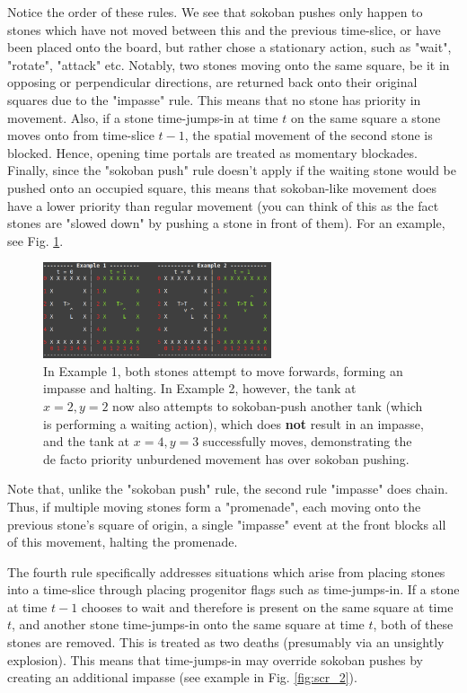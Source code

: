 \documentclass[12pt]{article}
\begin{document}
	Notice the order of these rules. We see that sokoban pushes only happen to stones which have not moved between this and the previous time-slice, or have been placed onto the board, but rather chose a stationary action, such as "wait", "rotate", "attack" etc. Notably, two stones moving onto the same square, be it in opposing or perpendicular directions, are returned back onto their original squares due to the "impasse" rule. This means that no stone has priority in movement. Also, if a stone time-jumps-in at time $t$ on the same square a stone moves onto from time-slice $t-1$, the spatial movement of the second stone is blocked. Hence, opening time portals are treated as momentary blockades. Finally, since the "sokoban push" rule doesn't apply if the waiting stone would be pushed onto an occupied square, this means that sokoban-like movement does have a lower priority than regular movement (you can think of this as the fact stones are "slowed down" by pushing a stone in front of them). For an example, see Fig. \ref{fig:scr_1}.
	
	\begin{figure}[h]
\begin{center}
    \includegraphics[width=0.6\textwidth]{images/diag_scr_1}
 \caption{In Example 1, both stones attempt to move forwards, forming an impasse and halting. In Example 2, however, the tank at $x=2,y=2$ now also attempts to sokoban-push another tank (which is performing a waiting action), which does \textbf{not} result in an impasse, and the tank at $x=4,y=3$ successfully moves, demonstrating the de facto priority unburdened movement has over sokoban pushing.}\label{fig:scr_1}
\end{center}
\end{figure}
	
	Note that, unlike the "sokoban push" rule, the second rule "impasse" does chain. Thus, if multiple moving stones form a "promenade", each moving onto the previous stone's square of origin, a single "impasse" event at the front blocks all of this movement, halting the promenade.

The fourth rule specifically addresses situations which arise from placing stones into a time-slice through placing progenitor flags such as time-jumps-in. If a stone at time $t-1$ chooses to wait and therefore is present on the same square at time $t$, and another stone time-jumps-in onto the same square at time $t$, both of these stones are removed. This is treated as two deaths (presumably via an unsightly explosion). This means that time-jumps-in may override sokoban pushes by creating an additional impasse (see example in Fig. \ref{fig:scr_2}).
\end{document}

